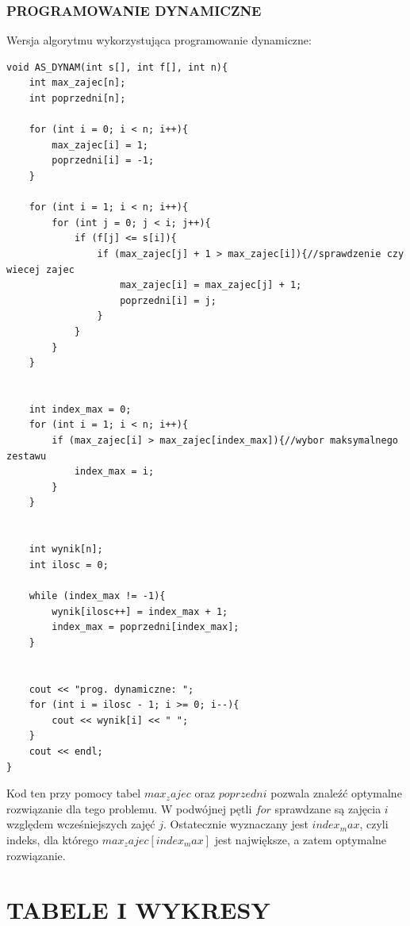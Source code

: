 \documentclass{article}
\begin{document}
\subsubsection{PROGRAMOWANIE DYNAMICZNE}
Wersja algorytmu wykorzystująca programowanie dynamiczne:
\begin{verbatim}
void AS_DYNAM(int s[], int f[], int n){
    int max_zajec[n];  
    int poprzedni[n];  

    for (int i = 0; i < n; i++){
        max_zajec[i] = 1;
        poprzedni[i] = -1;
    }

    for (int i = 1; i < n; i++){
        for (int j = 0; j < i; j++){
            if (f[j] <= s[i]){
                if (max_zajec[j] + 1 > max_zajec[i]){//sprawdzenie czy wiecej zajec
                    max_zajec[i] = max_zajec[j] + 1;
                    poprzedni[i] = j;
                }
            }
        }
    }


    int index_max = 0;
    for (int i = 1; i < n; i++){
        if (max_zajec[i] > max_zajec[index_max]){//wybor maksymalnego zestawu
            index_max = i;
        }
    }


    int wynik[n];
    int ilosc = 0;

    while (index_max != -1){
        wynik[ilosc++] = index_max + 1;
        index_max = poprzedni[index_max];
    }


    cout << "prog. dynamiczne: ";
    for (int i = ilosc - 1; i >= 0; i--){
        cout << wynik[i] << " ";
    }
    cout << endl;
}
\end{verbatim}
Kod ten przy pomocy tabel $max_zajec$ oraz $poprzedni$ pozwala znaleźć optymalne rozwiązanie dla tego problemu. W podwójnej pętli $for$ sprawdzane są zajęcia $i$ względem wcześniejszych zajęć $j$. Ostatecznie wyznaczany jest $index_max$, czyli indeks, dla którego $max_zajec[index_max]$ jest największe, a zatem optymalne rozwiązanie.
\section*{TABELE I WYKRESY}
\end{document}
